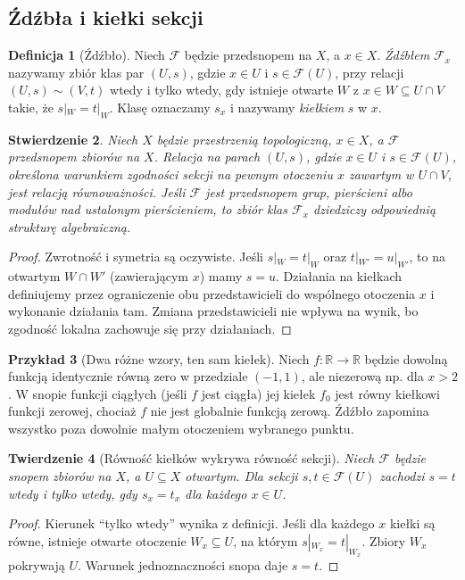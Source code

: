 \documentclass[11pt,a4paper,openany]{report}
\numberwithin{equation}{section}
\theoremstyle{plain}
\newtheorem{twierdzenie}{Twierdzenie}[section]
\newtheorem{stwierdzenie}[twierdzenie]{Stwierdzenie}
\theoremstyle{definition}
\newtheorem{definicja}[twierdzenie]{Definicja}
\newtheorem{przyklad}[twierdzenie]{Przykład}
\theoremstyle{remark}
\newcommand{\R}{\mathbb R}
\begin{document}
\subsection{Źdźbła i kiełki sekcji}
\begin{definicja}[Źdźbło]
\label{def:stalk}
Niech $\mathcal F$ będzie przedsnopem na $X$,
a $x\in X$. \emph{Źdźbłem} $\mathcal F_x$
nazywamy zbiór klas par $(U,s)$, gdzie $x\in U$
i $s\in\mathcal F(U)$, przy relacji
$(U,s)\sim(V,t)$ wtedy i tylko wtedy, gdy istnieje
otwarte $W$ z $x\in W\subseteq U\cap V$
takie, że $s|_W=t|_W$. Klasę oznaczamy $s_x$
i nazywamy \emph{kiełkiem} $s$ w $x$.
\end{definicja}

\begin{stwierdzenie}
Niech $X$ będzie przestrzenią topologiczną, $x\in X$,
a $\mathcal F$ przedsnopem zbiorów na $X$. Relacja na
parach $(U,s)$, gdzie $x\in U$ i $s\in\mathcal F(U)$,
określona warunkiem zgodności sekcji na pewnym otoczeniu
$x$ zawartym w $U\cap V$, jest relacją równoważności.
Jeśli $\mathcal F$ jest przedsnopem grup, pierścieni albo
modułów nad ustalonym pierścieniem, to zbiór klas
$\mathcal F_x$ dziedziczy odpowiednią strukturę algebraiczną.
\end{stwierdzenie}
\begin{proof}
Zwrotność i symetria są oczywiste. Jeśli
$s|_W=t|_W$ oraz $t|_{W'}=u|_{W'}$, to
na otwartym $W\cap W'$ (zawierającym $x$)
mamy $s=u$. Działania na kiełkach definiujemy
przez ograniczenie obu przedstawicieli do
wspólnego otoczenia $x$ i wykonanie działania tam.
Zmiana przedstawicieli nie wpływa na wynik,
bo zgodność lokalna zachowuje się przy działaniach.
\end{proof}

\begin{przyklad}[Dwa różne wzory, ten sam kiełek]
Niech $f:\R\to\R$ będzie dowolną funkcją
identycznie równą zero w przedziale $(-1,1)$,
ale niezerową np. dla $x>2$. W snopie funkcji
ciągłych (jeśli $f$ jest ciągła) jej kiełek
$f_0$ jest równy kiełkowi funkcji zerowej,
chociaż $f$ nie jest globalnie funkcją zerową.
Źdźbło zapomina wszystko poza dowolnie małym
otoczeniem wybranego punktu.
\end{przyklad}

\begin{twierdzenie}[Równość kiełków wykrywa równość sekcji]
\label{tw:germ-zero}
Niech $\mathcal F$ będzie snopem zbiorów na $X$,
a $U\subseteq X$ otwartym. Dla sekcji
$s,t\in\mathcal F(U)$ zachodzi $s=t$ wtedy
i tylko wtedy, gdy $s_x=t_x$ dla każdego $x\in U$.
\end{twierdzenie}
\begin{proof}
Kierunek ``tylko wtedy'' wynika z definicji.
Jeśli dla każdego $x$ kiełki są równe,
istnieje otwarte otoczenie $W_x\subseteq U$, na
którym $s|_{W_x}=t|_{W_x}$. Zbiory $W_x$ pokrywają $U$.
Warunek jednoznaczności snopa daje $s=t$.
\end{proof}
\end{document}
